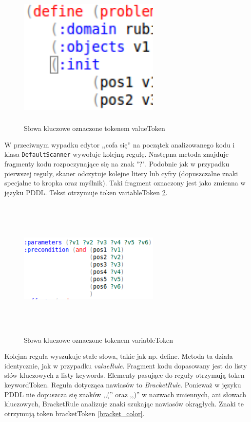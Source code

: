 \begin{figure}[h]
  \centering
    \includegraphics[width=7cm,height=7cm,keepaspectratio]{img/values-color.png}
    \caption{Słowa kluczowe oznaczone tokenem valueToken}
    \label{values_color}
\end{figure}

 W przeciwnym wypadku edytor ,,cofa się'' na początek analizowanego kodu i klasa \texttt{DefaultScanner} wywołuje kolejną regułę. Następna metoda znajduje fragmenty kodu rozpoczynające się na znak "?".  Podobnie jak w przypadku pierwszej reguły, skaner odczytuje kolejne litery lub cyfry (dopuszczalne znaki specjalne to kropka oraz myślnik). Taki fragment oznaczony jest jako zmienna w języku PDDL. Tekst otrzymuje token variableToken \ref{variable_color}.

\begin{figure}[h]
  \centering
    \includegraphics[width=7cm,height=7cm,keepaspectratio]{img/variable-color.png}
    \caption{Słowa kluczowe oznaczone tokenem variableToken}
    \label{variable_color}
\end{figure}

Kolejna reguła wyszukuje stałe słowa, takie jak np. define. Metoda ta działa identycznie, jak w przypadku \emph{valueRule}. Fragment kodu dopasowany jest do listy słów kluczowych z listy keywords. Elementy pasujące do reguły otrzymują token keywordToken. Reguła dotycząca nawiasów to \emph{BracketRule}. Ponieważ w języku PDDL nie dopuszcza się znaków ,,('' oraz ,,)'' w nazwach zmiennych, ani słowach kluczowych, BracketRule analizuje znaki szukając nawiasów okrągłych. Znaki te otrzymują token bracketToken \ref{bracket_color}.

